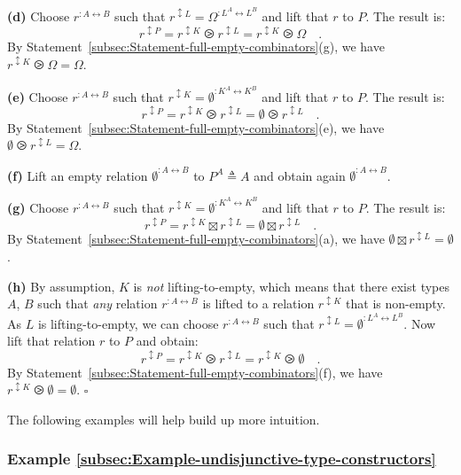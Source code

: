 \textbf{(d)} Choose $r^{:A\leftrightarrow B}$ such that $r^{\updownarrow L}=\Omega^{:L^{A}\leftrightarrow L^{B}}$
and lift that $r$ to $P$. The result is:
\[
r^{\updownarrow P}=r^{\updownarrow K}\ogreaterthan r^{\updownarrow L}=r^{\updownarrow K}\ogreaterthan\Omega\quad.
\]
By Statement~\ref{subsec:Statement-full-empty-combinators}(g), we
have $r^{\updownarrow K}\ogreaterthan\Omega=\Omega$.

\textbf{(e)} Choose $r^{:A\leftrightarrow B}$ such that $r^{\updownarrow K}=\emptyset^{:K^{A}\leftrightarrow K^{B}}$
and lift that $r$ to $P$. The result is:
\[
r^{\updownarrow P}=r^{\updownarrow K}\ogreaterthan r^{\updownarrow L}=\emptyset\ogreaterthan r^{\updownarrow L}\quad.
\]
By Statement~\ref{subsec:Statement-full-empty-combinators}(e), we
have $\emptyset\ogreaterthan r^{\updownarrow L}=\Omega$.

\textbf{(f)} Lift an empty relation $\emptyset^{:A\leftrightarrow B}$
to $P^{A}\triangleq A$ and obtain again $\emptyset^{:A\leftrightarrow B}$.

\textbf{(g)} Choose $r^{:A\leftrightarrow B}$ such that $r^{\updownarrow K}=\emptyset^{:K^{A}\leftrightarrow K^{B}}$
and lift that $r$ to $P$. The result is:
\[
r^{\updownarrow P}=r^{\updownarrow K}\boxtimes r^{\updownarrow L}=\emptyset\boxtimes r^{\updownarrow L}\quad.
\]
By Statement~\ref{subsec:Statement-full-empty-combinators}(a), we
have $\emptyset\boxtimes r^{\updownarrow L}=\emptyset$.

\textbf{(h)} By assumption, $K$ is \emph{not} lifting-to-empty, which
means that there exist types $A$, $B$ such that \emph{any} relation
$r^{:A\leftrightarrow B}$ is lifted to a relation $r^{\updownarrow K}$
that is non-empty. As $L$ is lifting-to-empty, we can choose $r^{:A\leftrightarrow B}$
such that $r^{\updownarrow L}=\emptyset^{:L^{A}\leftrightarrow L^{B}}$.
Now lift that relation $r$ to $P$ and obtain:
\[
r^{\updownarrow P}=r^{\updownarrow K}\ogreaterthan r^{\updownarrow L}=r^{\updownarrow K}\ogreaterthan\emptyset\quad.
\]
By Statement~\ref{subsec:Statement-full-empty-combinators}(f), we
have $r^{\updownarrow K}\ogreaterthan\emptyset=\emptyset$. $\square$

The following examples will help build up more intuition.

\subsubsection{Example \label{subsec:Example-undisjunctive-type-constructors}\ref{subsec:Example-undisjunctive-type-constructors}}

